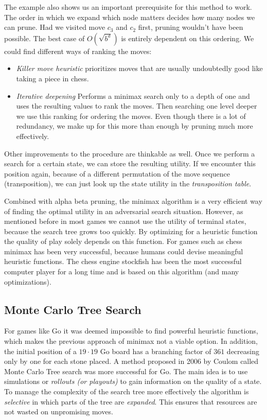 The example also shows us an important prerequisite for this method to work. The order in which we expand which node matters decides how many nodes we can prune. Had we visited move $ c_3 $ and $ c_2 $ first, pruning wouldn't have been possible. The best case of $ O(\sqrt{b^d}) $ is entirely dependent on this ordering. We could find different ways of ranking the moves:

\begin{itemize}
    \item \textit{Killer move heuristic} prioritizes moves that are usually undoubtedly good like taking a piece in chess.
    \item \textit{Iterative deepening} Performs a minimax search only to a depth of one and uses the resulting values to rank the moves. Then searching one level deeper we use this ranking for ordering the moves. Even though there is a lot of redundancy, we make up for this more than enough by pruning much more effectively.
\end{itemize}

Other improvements to the procedure are thinkable as well. Once we perform a search for a certain state, we can store the resulting utility. If we encounter this position again, because of a different permutation of the move sequence (transposition), we can just look up the state utility in the \textit{transposition table}.

Combined with alpha beta pruning, the minimax algorithm is a very efficient way of finding the optimal utility in an adversarial search situation. However, as mentioned before in most games we cannot use the utility of terminal states, because the search tree grows too quickly. By optimizing for a heuristic function the quality of play solely depends on this function. For games such as chess minimax has been very successful, because humans could devise meaningful heuristic functions. The chess engine stockfish has been the most successful computer player for a long time and is based on this algorithm (and many optimizations). \cite{noauthor_stockfish_2021, noauthor_stockfish_nodate}

\subsection{Monte Carlo Tree Search}
For games like Go it was deemed impossible to find powerful heuristic functions, which makes the previous approach of minimax not a viable option. In addition, the initial position of a $19 \cdot 19$ Go board has a branching factor of $361$ decreasing only by one for each stone placed. A method proposed in 2006 by Coulom \cite{coulom_efficient_2007} called Monte Carlo Tree search was more successful for Go. The main idea is to use simulations or \textit{rollouts (or playouts)} to gain information on the quality of a state. To manage the complexity of the search tree more effectively the algorithm is \textit{selective} in which parts of the tree are \textit{expanded}. This ensures that resources are not wasted on unpromising moves.

